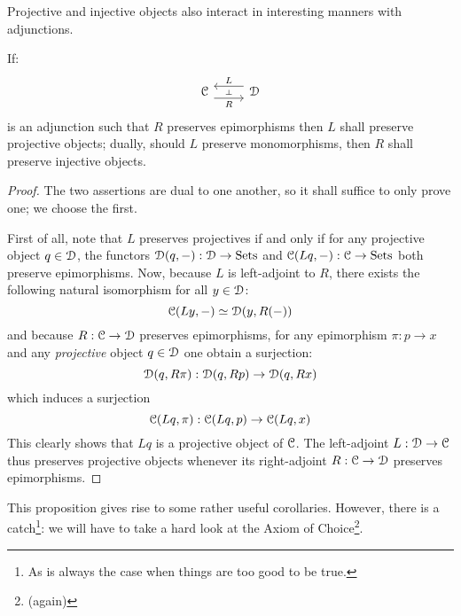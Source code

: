                 Projective and injective objects also interact in interesting manners with adjunctions. 
                \begin{proposition} \label{prop: projectives_and_injectives_under_adjoints}
                    If:
                        $$
                            \begin{tikzcd}
                            	\C & \D
                            	\arrow[""{name=0, anchor=center, inner sep=0}, "R"', shift right=2, from=1-1, to=1-2]
                            	\arrow[""{name=1, anchor=center, inner sep=0}, "L"', shift right=2, from=1-2, to=1-1]
                            	\arrow["\dashv"{anchor=center, rotate=-90}, draw=none, from=1, to=0]
                            \end{tikzcd}
                        $$
                    is an adjunction such that $R$ preserves epimorphisms then $L$ shall preserve projective objects; dually, should $L$ preserve monomorphisms, then $R$ shall preserve injective objects. 
                \end{proposition}
                    \begin{proof}
                        The two assertions are dual to one another, so it shall suffice to only prove one; we choose the first.
                        
                        First of all, note that $L$ preserves projectives if and only if for any projective object $q \in \mathcal{D}$, the functors $\mathcal{D}(q, -): \mathcal{D} \to \mathrm{Sets}$ and $\mathcal{C}(Lq, -): \mathcal{C} \to \mathrm{Sets}$ both preserve epimorphisms. Now, because $L$ is left-adjoint to $R$, there exists the following natural isomorphism for all $y \in \mathcal{D}$:
                            $$\mathcal{C}(Ly, -) \simeq \mathcal{D}(y, R(-))$$
                        and because $R: \mathcal{C} \to \mathcal{D}$ preserves epimorphisms, for any epimorphism $\pi: p \to x$ and any \textit{projective} object $q \in \mathcal{D}$ one obtain a surjection:
                            $$\mathcal{D}(q, R\pi): \mathcal{D}(q, Rp) \to \mathcal{D}(q, Rx)$$
                        which induces a surjection
                            $$\mathcal{C}(Lq, \pi): \mathcal{C}(Lq, p) \to \mathcal{C}(Lq, x)$$
                        This clearly shows that $Lq$ is a projective object of $\mathcal{C}$. The left-adjoint $L: \mathcal{D} \to \mathcal{C}$ thus preserves projective objects whenever its right-adjoint $R: \mathcal{C} \to \mathcal{D}$ preserves epimorphisms.
                    \end{proof}
                This proposition gives rise to some rather useful corollaries. However, there is a catch\footnote{As is always the case when things are too good to be true.}: we will have to take a hard look at the Axiom of Choice\footnote{(again)}.
